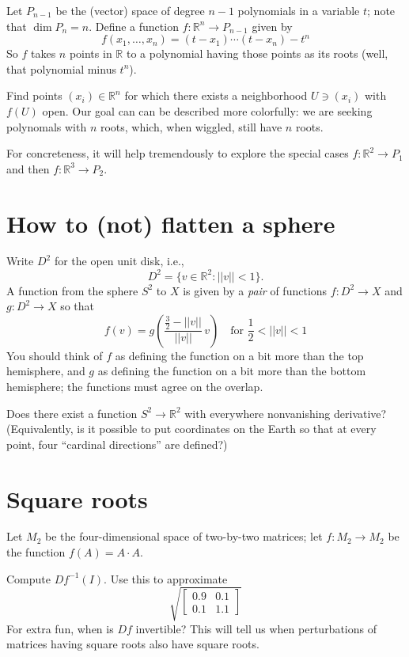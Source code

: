 \documentclass[12pt]{article}
\newcommand{\R}{\mathbb{R}}
\begin{document}
Let $P_{n-1}$ be the (vector) space of degree $n-1$ polynomials in a
variable $t$; note that $\dim P_n = n$.  Define a function $f : \R^n
\to P_{n-1}$ given by
$$
f(x_1,\ldots,x_n) = (t - x_1) \cdots (t - x_n) - t^n
$$
So $f$ takes $n$ points in $\R$ to a polynomial having those points as
its roots (well, that polynomial minus $t^n$).

Find points $(x_i) \in \R^n$ for which there exists a neighborhood $U
\ni (x_i)$ with $f(U)$ open.  Our goal can can be described more
colorfully: we are seeking polynomals with $n$ roots, which, when
wiggled, still have $n$ roots.

For concreteness, it will help tremendously to explore the special
cases $f : \R^2 \to P_1$ and then $f : \R^3 \to P_2$.

\section{How to (not) flatten a sphere}

Write $D^2$ for the open unit disk, i.e.,
$$
D^2 = \{ v \in \R^2 : ||v|| < 1 \}.
$$
A function from the sphere $S^2$ to $X$ is given by a \textit{pair} of
functions $f : D^2 \to X$ and $g : D^2 \to X$ so that
$$
f(v) = g\left( \frac{\frac{3}{2} - ||v||}{||v||} \, v \right) \hspace{1em} \mbox{for $\frac{1}{2} < ||v|| < 1$}
$$
You should think of $f$ as defining the function on a bit more than
the top hemisphere, and $g$ as defining the function on a bit more
than the bottom hemisphere; the functions must agree on the overlap.

Does there exist a function $S^2 \to \R^2$ with everywhere
nonvanishing derivative?  (Equivalently, is it possible to put
coordinates on the Earth so that at every point, four ``cardinal
directions'' are defined?)

\section{Square roots}

Let $M_2$ be the four-dimensional space of two-by-two matrices; let $f
: M_2 \to M_2$ be the function $f(A) = A \cdot A$.

Compute $D f^{-1}(I)$.  Use this to approximate
$$
\sqrt{ \begin{bmatrix}
0.9 & 0.1  \\
0.1 & 1.1
\end{bmatrix}}
$$
For extra fun, when is $D f$ invertible?  This will tell us when
perturbations of matrices having square roots also have square roots.
\end{document}
